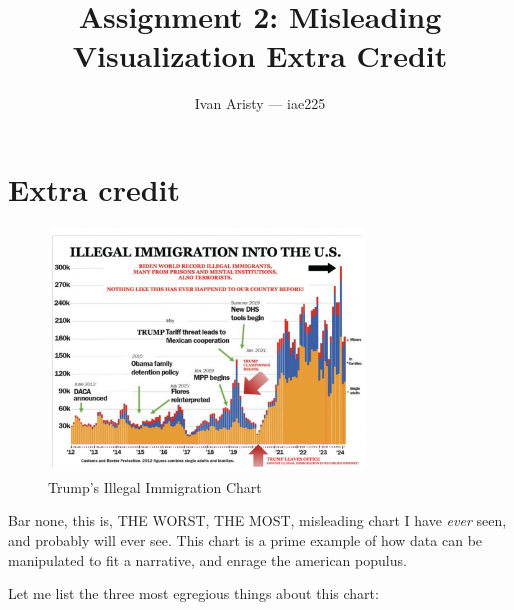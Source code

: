 \documentclass{article}
\title{Assignment 2: Misleading Visualization Extra Credit}
\author{Ivan Aristy — iae225}
\begin{document}
  \maketitle %
  \thispagestyle{empty}

\section{Extra credit}
\label{sec:sec1}

\begin{figure}[ht] %
  \centering
  \includegraphics[width=0.75\textwidth]{figs/Trump Chart.png}
  \caption{
      Trump's Illegal Immigration Chart
  }
  \label{fig:fig1}
\end{figure}

Bar none, this is, THE WORST, THE MOST, misleading chart I have \textit{ever} seen, and probably will ever see. 
This chart is a prime example of how data can be manipulated to fit a narrative, and enrage
the american populus.

Let me list the three most egregious things about this chart:
\end{document}
